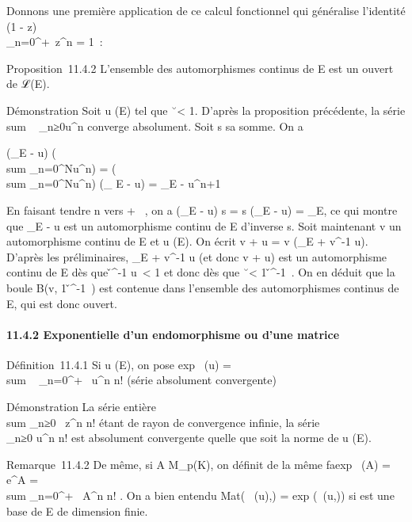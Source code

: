 \documentclass[]{article}
\begin{document}
Donnons une première application de ce calcul fonctionnel qui généralise
l'identité (1 - z)\\\sum
 _n=0^+\infty~z^n = 1~:

Proposition~11.4.2 L'ensemble des automorphismes continus de E est un
ouvert de ℒ(E).

Démonstration Soit u (E) tel que
\u\ \textless{} 1.
D'après la proposition précédente, la série
\\sum ~
_n≥0u^n converge absolument. Soit s sa somme. On a

(\mathrmId_E - u) \cdot\left
(\\sum
_n=0^Nu^n\right ) =
\left (\\sum
_n=0^Nu^n\right ) \cdot
(\mathrmId_ E - u) =
\mathrmId_E - u^n+1

En faisant tendre n vers + \infty~, on a
(\mathrmId_E - u) \cdot s = s \cdot
(\mathrmId_E - u) =
\mathrmId_E, ce qui montre que
\mathrmId_E - u est un automorphisme continu
de E d'inverse s. Soit maintenant v un automorphisme continu de E et u
(E). On écrit v + u = v \cdot (\mathrmId_E +
v^-1 \cdot u). D'après les préliminaires,
\mathrmId_E + v^-1 \cdot u (et donc v
+ u) est un automorphisme continu de E dès que
\v^-1 \cdot u\
\textless{} 1 et donc dès que
\u\ \textless{} 1
\over
\v^-1\ .
On en déduit que la boule B(v, 1 \over
\v^-1\ )
est contenue dans l'ensemble des automorphismes continus de E, qui est
donc ouvert.

\paragraph{11.4.2 Exponentielle d'un endomorphisme ou d'une matrice}

Définition~11.4.1 Si u (E), on pose exp~ (u)
= \\sum ~
_n=0^+\infty~ u^n \over n! (série
absolument convergente)

Démonstration La série entière
\\sum  _n≥0~
z^n \over n! étant de rayon de convergence
infinie, la série \\\sum
 _n≥0 u^n \over n! est
absolument convergente quelle que soit la norme de u (E).

Remarque~11.4.2 De même, si A \in M_p(K), on définit de la même
fa\ccon exp~ (A) =
e^A =\ \\sum
 _n=0^+\infty~ A^n \over n! .
On a bien entendu
Mat(\exp~ (u),)
= exp (\Mat~(u,\mathcal{E})) si
\mathcal{E} est une base de E de dimension finie.
\end{document}
